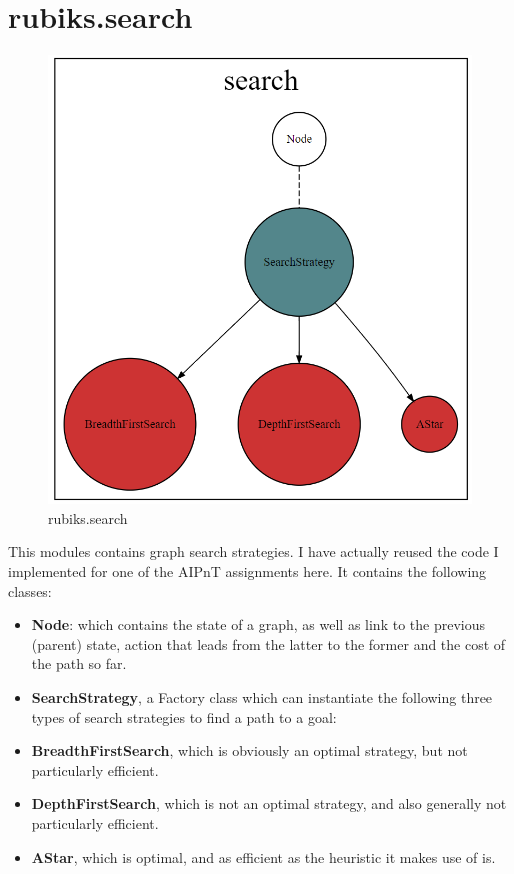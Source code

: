 \section{rubiks.search}
\begin{figure}[H]
\centering
\includegraphics[scale=0.25]{./Figures/codebasesearch}
\caption[Codebase]{rubiks.search}
\label{fig:Codebasesearch}
\end{figure}
This modules contains graph search strategies. I have actually reused the code I implemented for one of the AIPnT assignments here. It contains the following classes:
\begin{itemize}
\item \textbf{Node}: which contains the state of a graph, as well as link to the previous (parent) state, action that leads from the latter to the former and the cost of the path so far.
\item \textbf{SearchStrategy}, a Factory class which can instantiate the following three types of search strategies to find a path to a goal:
\item \textbf{BreadthFirstSearch}, which is obviously an optimal strategy, but not particularly efficient.
\item \textbf{DepthFirstSearch}, which is not an optimal strategy, and also generally not particularly efficient.
\item \textbf{AStar}, which is optimal, and as efficient as the heuristic it makes use of is.
\end{itemize}

